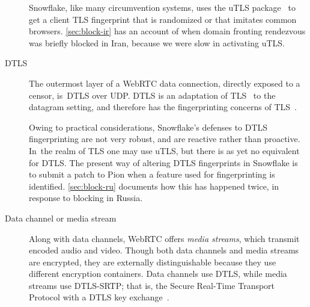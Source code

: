 \documentclass[letterpaper,twocolumn]{article}
\newcommand{\firstterm}[1]{\textit{#1}}
\begin{document}
\begin{description}
Snowflake, like many circumvention systems,
uses the uTLS package~\cite[\S VII]{Frolov2019a}
to get a client TLS fingerprint that is randomized or that imitates common browsers.
\autoref{sec:block-ir} has an account of when
domain fronting rendezvous was briefly blocked in Iran,
because we were slow in activating uTLS.

\item[DTLS]
The outermost layer of a WebRTC data connection,
directly exposed to a censor,
is~DTLS over UDP.
DTLS is an adaptation of TLS~\cite[\S 1]{rfc9147} to the datagram setting,
and therefore has the fingerprinting concerns of TLS~\cite{Frolov2019a}.

Owing to practical considerations,
Snowflake's defenses to DTLS fingerprinting are not very robust,
and are reactive rather than proactive.
In~the realm of TLS one may use uTLS,
but there is as yet no equivalent for DTLS.
The present way of altering DTLS fingerprints in Snowflake
is to submit a patch to Pion
when a feature used for fingerprinting is identified.
\autoref{sec:block-ru} documents how this has happened twice,
in response to blocking in Russia.

%

\item[Data channel or media stream]
Along with data channels, WebRTC offers \firstterm{media streams},
which transmit encoded audio and video.
Though both data channels and media streams are encrypted,
they are externally distinguishable
because they use different encryption containers.
Data channels use DTLS,
while media streams use DTLS-SRTP;
that is, the Secure Real-Time Transport Protocol
with a DTLS key exchange~\cite[\S 4.3]{rfc8827}.


\end{description}
\end{document}
